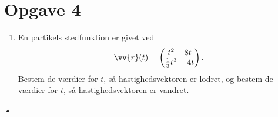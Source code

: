 \section*{Opgave 4}
\begin{enumerate}[label=\roman*)]
	\item En partikels stedfunktion er givet ved
	\begin{align*}
		\vv{r}(t) = 
		\begin{pmatrix}
			t^2-8t \\
			\frac{1}{3}t^3-4t
		\end{pmatrix}.
	\end{align*}
	Bestem de værdier for $t$, så hastighedsvektoren er lodret, og bestem de værdier for $t$, så hastighedsvektoren er vandret. 
\end{enumerate}
\textsl{•}